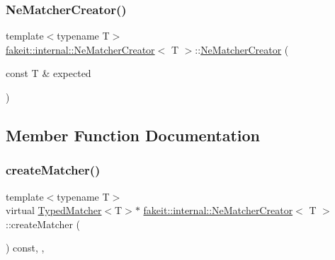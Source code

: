\mbox{\label{structfakeit_1_1internal_1_1NeMatcherCreator_a15ad0bf386a46786631d4f46b730e646}} 
\subsubsection{\texorpdfstring{NeMatcherCreator()}{NeMatcherCreator()}\hspace{0.1cm}{\footnotesize\ttfamily [9/9]}}
{\footnotesize\ttfamily template$<$typename T$>$ \\
\mbox{\hyperlink{structfakeit_1_1internal_1_1NeMatcherCreator}{fakeit\+::internal\+::\+Ne\+Matcher\+Creator}}$<$ T $>$\+::\mbox{\hyperlink{structfakeit_1_1internal_1_1NeMatcherCreator}{Ne\+Matcher\+Creator}} (\begin{DoxyParamCaption}\item[{const T \&}]{expected }\end{DoxyParamCaption})\hspace{0.3cm}{\ttfamily [inline]}}



\subsection{Member Function Documentation}
\mbox{\label{structfakeit_1_1internal_1_1NeMatcherCreator_a5207ab2452c0d075a629b828115716cb}} 
\subsubsection{\texorpdfstring{createMatcher()}{createMatcher()}\hspace{0.1cm}{\footnotesize\ttfamily [1/9]}}
{\footnotesize\ttfamily template$<$typename T$>$ \\
virtual \mbox{\hyperlink{structfakeit_1_1TypedMatcher}{Typed\+Matcher}}$<$T$>$$\ast$ \mbox{\hyperlink{structfakeit_1_1internal_1_1NeMatcherCreator}{fakeit\+::internal\+::\+Ne\+Matcher\+Creator}}$<$ T $>$\+::create\+Matcher (\begin{DoxyParamCaption}{ }\end{DoxyParamCaption}) const\hspace{0.3cm}{\ttfamily [inline]}, {\ttfamily [override]}, {\ttfamily [virtual]}}



